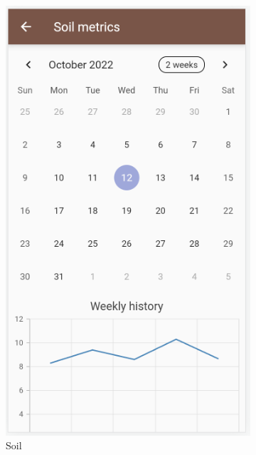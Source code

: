 \begin{figure}
\begin{subfigure}[b]{0.3\columnwidth}
        \includegraphics[width=\textwidth]{images/soil.png}
        \caption{Soil}
    \end{subfigure}
    \begin{subfigure}[b]{0.3\columnwidth}
        \centering

\end{subfigure}
\end{figure}
